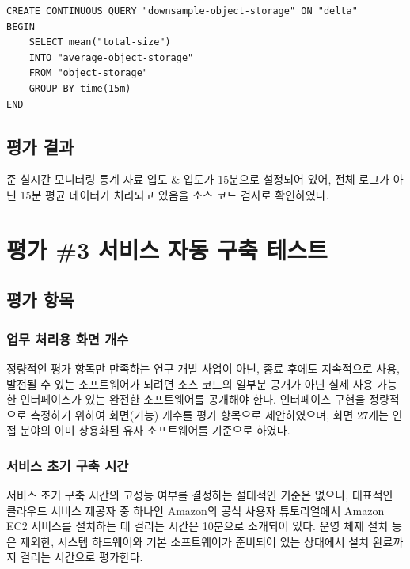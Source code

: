 \documentclass[11pt,oneside,openany,itemph,a4paper,chapter]{oblivoir}
\newenvironment{tablekeyvalue}[2]
{\bgroup
\table[H] \tabularx{\linewidth}{|
>{\setlength{\baselineskip}{1.2\baselineskip}}P{#1\linewidth}|
>{\setlength{\baselineskip}{1.2\baselineskip}}P{#2\linewidth}|}
\hline}
{\endtabularx \endtable \egroup}
\begin{document}
\begin{verbatim}
CREATE CONTINUOUS QUERY "downsample-object-storage" ON "delta"
BEGIN
    SELECT mean("total-size")
    INTO "average-object-storage"
    FROM "object-storage"
    GROUP BY time(15m)
END
\end{verbatim}

\subsection{평가 결과}
\begin{tablekeyvalue}{0.3}{0.7}
준 실시간 모니터링 통계 자료 입도 & 입도가 15분으로 설정되어 있어, 전체 로그가 아닌 15분 평균 데이터가 처리되고 있음을 소스 코드 검사로 확인하였다. \\ \hline
\end{tablekeyvalue}

\section{평가 \#3\label{test3} 서비스 자동 구축 테스트}
\subsection{평가 항목}
\subsubsection{업무 처리용 화면 개수}
정량적인 평가 항목만 만족하는 연구 개발 사업이 아닌, 종료 후에도 지속적으로 사용, 발전될 수 있는 소프트웨어가 되려면 소스 코드의 일부분 공개가 아닌 실제 사용 가능한 인터페이스가 있는 완전한 소프트웨어를 공개해야 한다. 인터페이스 구현을 정량적으로 측정하기 위하여 화면(기능) 개수를 평가 항목으로 제안하였으며, 화면 27개는 인접 분야의 이미 상용화된 유사 소프트웨어를 기준으로 하였다.

\subsubsection{서비스 초기 구축 시간}
서비스 초기 구축 시간의 고성능 여부를 결정하는 절대적인 기준은 없으나, 대표적인 클라우드 서비스 제공자 중 하나인 Amazon의 공식 사용자 튜토리얼에서 Amazon EC2 서비스를 설치하는 데 걸리는 시간은 10분으로 소개되어 있다. 운영 체제 설치 등은 제외한, 시스템 하드웨어와 기본 소프트웨어가 준비되어 있는 상태에서 설치 완료까지 걸리는 시간으로 평가한다.
\end{document}
